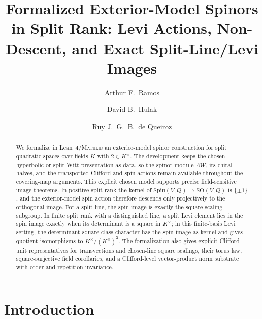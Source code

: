 \documentclass{birkjour}
\title[Formalized exterior-model spinors in split rank]
  {Formalized Exterior-Model Spinors in Split Rank: Levi Actions,
   Non-Descent, and Exact Split-Line/Levi Images}
\theoremstyle{plain}
\theoremstyle{definition}
\theoremstyle{remark}
\newcommand{\Spin}{\mathrm{Spin}}
\newcommand{\SO}{\mathrm{SO}}
\newcommand{\wedgeW}{\Lambda W}
\newcommand{\Lean}{Lean~4\xspace}
\newcommand{\Mathlib}{\textsc{Mathlib}\xspace}
\begin{document}
\author[A.~F.~Ramos]{Arthur F.~Ramos}
\address{Microsoft, USA}

\author[D.~B.~Hulak]{David B.~Hulak}
\address{Independent Researcher, Brazil}

\author[R.~J.~G.~B.~de Queiroz]{Ruy J.~G.~B.~de Queiroz}
\address{Centro de Inform\'atica, Universidade Federal de Pernambuco, Brazil}



\begin{abstract}
We formalize in \Lean/\Mathlib an exterior-model spinor construction for split
quadratic spaces over fields $K$ with $2\in K^\times$. The development keeps the
chosen hyperbolic or split-Witt presentation as data, so the spinor module
$\wedgeW$, its chiral halves, and the transported Clifford and spin actions
remain available throughout the covering-map arguments. This explicit
chosen model supports precise field-sensitive image theorems. In positive split
rank the kernel of
$\Spin(V,Q)\to\SO(V,Q)$ is $\{\pm1\}$, and the exterior-model spin action
therefore descends only projectively to the orthogonal image. For a split line,
the spin image is exactly the square-scaling subgroup. In finite split rank with
a distinguished line, a split Levi element lies in the spin image exactly when
its determinant is a square in $K^\times$; in this finite-basis Levi setting,
the determinant
square-class character has the spin image as kernel and gives quotient
isomorphisms to $K^\times/(K^\times)^2$. The formalization also gives
explicit Clifford-unit representatives for transvections and chosen-line square
scalings, their torus law, square-surjective field corollaries, and a
Clifford-level vector-product norm substrate with order and repetition
invariance.
\end{abstract}

\maketitle

\section{Introduction}
\label{sec:intro}
\end{document}
